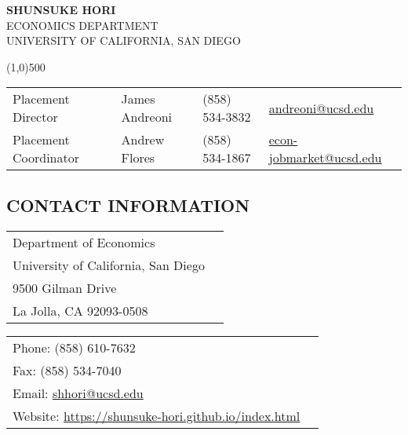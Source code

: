 \documentclass{article}
\begin{document}
 
\thispagestyle{empty}
\begin{center}
{\Large \textbf{SHUNSUKE HORI}}\\
\vspace{0.1cm}
{\Large ECONOMICS DEPARTMENT}\\
\vspace{0.1cm}
{\Large UNIVERSITY OF CALIFORNIA, SAN DIEGO}\\
\end{center}
	
\vspace{-0.7cm}			        
\begin{center}
\line(1,0){500}
\end{center}

\begin{tabularx}{\textwidth}{XXXX}
Placement Director &	James Andreoni	& (858) 534-3832 & \href{mailto:andreoni@ucsd.edu}{andreoni@ucsd.edu}  \\
Placement Coordinator &	Andrew Flores &	(858) 534-1867 & \href{mailto:econ-jobmarket@ucsd.edu}{econ-jobmarket@ucsd.edu}
\end{tabularx} 



\noindent \subsection*{CONTACT INFORMATION}


\begin{minipage}{0.45\textwidth}
\begin{tabularx}{\textwidth}{XX}
Department of Economics \\
University of California, San Diego \\
9500 Gilman Drive \\
La Jolla, CA 92093-0508 \\
\end{tabularx} 
\end{minipage}	
\begin{minipage}{0.45\textwidth}
\begin{tabularx}{\textwidth}{XX}
Phone: (858) 610-7632 \\
Fax: (858) 534-7040 \\
Email: \href{mailto:shhori@ucsd.edu}{shhori@ucsd.edu} \\
Website: \mbox{\url{https://shunsuke-hori.github.io/index.html}} \\
\end{tabularx} 
\end{minipage}
\end{document}
